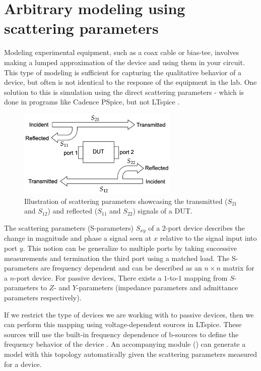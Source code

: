 \section{Arbitrary modeling using scattering parameters} \label{sparammodels}

Modeling experimental equipment, such as a coax cable or bias-tee, involves making a 
lumped approximation of the device and using them in your circuit. 
This type of modeling is sufficient for capturing the qualitative behavior of a device,
but often is not identical to the response of the equipment in the lab.
One solution to this is simulation using the direct scattering parameters - which is
done in programs like Cadence PSpice, but not LTspice \cite{hspice}.

\begin{figure}[h]
    \centering
    \includegraphics[width=3in]{figs/sxy_diagram.png}
    \caption{Illustration of scattering parameters showcasing the transmitted ($S_{21}$ and $S_{12}$) and reflected ($S_{11}$ and $S_{22}$) signals of a DUT.}
    \label{fig:sxy}
\end{figure}

The scattering parameters (S-parameters) $S_{xy}$ of a $2$-port device describes the
change in magnitude and phase a signal seen at $x$ relative to the signal 
input into port $y$. This notion can be generalize to multiple ports
by taking successive measurements and termination the third port using a
matched load. The S-parameters are frequency dependent and can be described
as an $n\times n$ matrix for a $n$-port device. For passive devices, There exists a 
$1$-to-$1$ mapping from $S$-parameters to $Z$- and $Y$-parameters (impedance 
parameters and admittance parameters respectively).

If we restrict the type of devices we are working with to passive devices,
then we can perform this mapping using voltage-dependent sources in 
LTspice. These sources will use the built-in frequency dependence of b-sources to
define the frequency behavior of the device \cite{microsim}. An accompanying 
module () can generate a model with this topology
automatically given the scattering parameters measured for a device.

